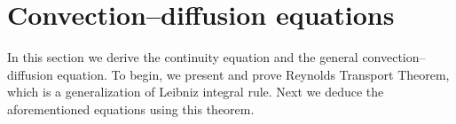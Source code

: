 
\section{Convection--diffusion equations}
\label{sec:the_convection_diffusion_equations}

In this section we derive the continuity equation and the general convection--diffusion
equation. To begin, we present and prove Reynolds Transport Theorem, which
is a generalization of Leibniz integral rule. Next we deduce the aforementioned
equations using this theorem.






